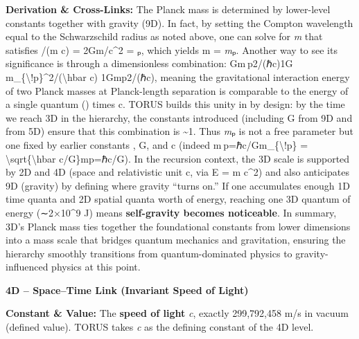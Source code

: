 \documentclass[
]{article}
\begin{document}
{\textbf{Derivation \& Cross-Links:} The Planck mass is determined by
lower-level constants together with gravity (9D). In fact, by setting
the Compton wavelength equal to the Schwarzschild radius as noted above,
one can solve for \emph{m} that satisfies \hbar/(m c) = 2Gm/c\^{}2 =
\emph{\ell}ₚ, which yields m = \emph{m}ₚ\hspace{0pt}. Another way to see
its significance is through a dimensionless combination: Gm ⁣p2/(ℏc)\approx1G
m\_\{\textbackslash!p\}\^{}2/(\textbackslash hbar c) \approx
1Gmp2\hspace{0pt}/(ℏc)\hspace{0pt}, meaning the gravitational
interaction energy of two Planck masses at Planck-length separation is
comparable to the energy of a single quantum (\hbar) times c. TORUS builds
this unity in by design: by the time we reach 3D in the hierarchy, the
constants introduced (including G from 9D and \hbar from 5D) ensure that
this combination is \textasciitilde1\hspace{0pt}. Thus \emph{m}ₚ is not
a free parameter but one fixed by earlier constants \hbar, G, and c (indeed
m ⁣p=ℏc/Gm\_\{\textbackslash!p\} =
\textbackslash sqrt\{\textbackslash hbar
c/G\}mp\hspace{0pt}=ℏc/G\hspace{0pt}). In the recursion context, the 3D
scale is supported by 2D and 4D (space and relativistic unit c, via E =
m c\^{}2) and also anticipates 9D (gravity) by defining where gravity
``turns on.'' If one accumulates enough 1D time quanta and 2D spatial
quanta worth of energy, reaching one 3D quantum of energy (∼2×10\^{}9 J)
means \textbf{self-gravity becomes noticeable}\hspace{0pt}. In summary,
3D's Planck mass ties together the foundational constants from lower
dimensions into a mass scale that bridges quantum mechanics and
gravitation, ensuring the hierarchy smoothly transitions from
quantum-dominated physics to gravity-influenced physics at this point.

\textbf{4D -- Space--Time Link (Invariant Speed of Light)}

\textbf{Constant \& Value:} The \textbf{speed of light} \emph{c},
exactly 299,792,458 m/s in vacuum (defined value)\hspace{0pt}. TORUS
takes \emph{c} as the defining constant of the 4D level.

}
\end{document}
